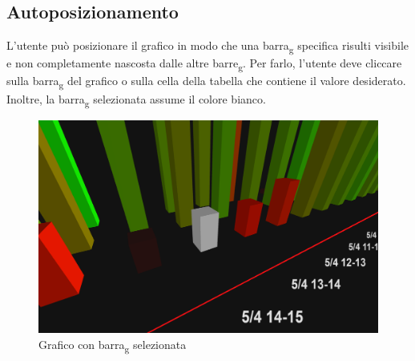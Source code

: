 \subsection{Autoposizionamento}
L'utente può posizionare il grafico in modo che una barra\textsubscript{g} specifica risulti
visibile e non completamente nascosta dalle altre barre\textsubscript{g}. 
Per farlo, l'utente deve cliccare sulla barra\textsubscript{g} del grafico o sulla
cella della tabella che contiene il valore desiderato. Inoltre, la barra\textsubscript{g}
selezionata assume il colore bianco.
\begin{figure}[ht!]
    \centering
    \includegraphics[scale=0.45]{template/images/env/autofocus.png}
    \caption{Grafico con barra\textsubscript{g} selezionata}
\end{figure}